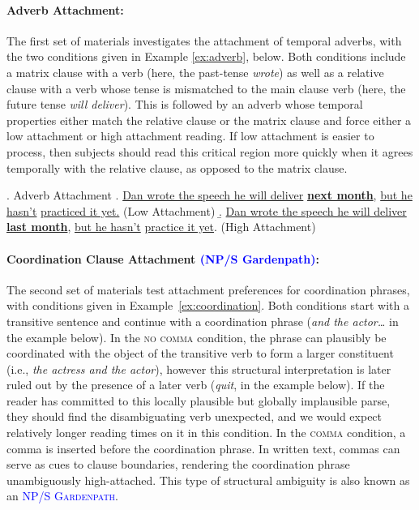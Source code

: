 \documentclass[12pt]{article}
\newcommand{\nocomma}{\textsc{no comma}\xspace}
\newcommand{\comma}{\textsc{comma}\xspace}
\newcommand{\defn}[1]{\textsc{#1}}
\newcommand{\word}[1]{\textit{#1}}
\newcommand{\change}[1]{\textcolor{blue}{#1}}
\begin{document}
{\paragraph{Adverb Attachment:} The first set of materials investigates the attachment of temporal adverbs, with the two conditions given in Example \ref{ex:adverb}, below. Both conditions include a matrix clause with a verb (here, the past-tense \word{wrote}) as well as a relative clause with a verb whose tense is mismatched to the main clause verb (here, the future tense \word{will deliver}). This is followed by an adverb whose temporal properties either match the relative clause or the matrix clause and force either a low attachment or high attachment reading. If low attachment is easier to process, then subjects should read this critical region more quickly when it agrees temporally with the relative clause, as opposed to the matrix clause.

\ex. Adverb Attachment \label{ex:adverb}
\a. \ul{Dan wrote the speech he will deliver} \ul{\textbf{next month}}, \ul{but he hasn't} \ul{practiced it yet.} ({\sc Low Attachment})
\b. \ul{Dan wrote the speech he will deliver} \ul{\textbf{last month}}, \ul{but he hasn't} \ul{practice it yet}. ({\sc High Attachment})

\paragraph{Coordination Clause Attachment \change{(NP/S Gardenpath)}:} The second set of materials test attachment preferences for coordination phrases, with conditions given in Example~\ref{ex:coordination}. Both conditions start with a transitive sentence and continue with a coordination phrase (\word{and the actor\dots} in the example below). In the \nocomma condition, the phrase can plausibly be coordinated with the object of the transitive verb to form a larger constituent (i.e., \word{the actress and the actor}), however this structural interpretation is later ruled out by the presence of a later verb (\word{quit}, in the example below). If the reader has committed to this locally plausible but globally implausible parse, they should find the disambiguating verb unexpected, and we would expect relatively longer reading times on it in this condition. In the \comma condition, a comma is inserted before the coordination phrase. In written text, commas can serve as cues to clause boundaries, rendering the coordination phrase unambiguously high-attached. This type of structural ambiguity is also known as an \change{\defn{NP/S Gardenpath}}.

}
\end{document}
